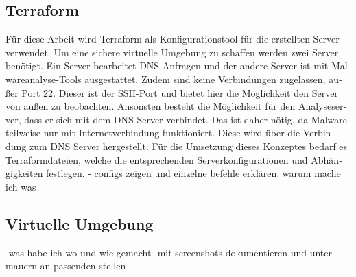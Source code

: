 \begin{otherlanguage}{ngerman}
\subsection{Terraform}\label{Praktisches Terraform}
Für diese Arbeit wird Terraform als Konfigurationstool für die erstellten Server verwendet. Um eine sichere virtuelle Umgebung zu schaffen werden zwei Server benötigt. Ein Server bearbeitet DNS-Anfragen und der andere Server ist mit Malwareanalyse-Tools ausgestattet. Zudem sind keine Verbindungen zugelassen, außer Port 22. Dieser ist der SSH-Port und bietet hier die Möglichkeit den Server von außen zu beobachten. Ansonsten besteht die Möglichkeit für den Analyseserver, dass er sich mit dem DNS Server verbindet. Das ist daher nötig, da Malware teilweise nur mit Internetverbindung funktioniert. Diese wird über die Verbindung zum DNS Server hergestellt. 
\newline
Für die Umsetzung dieses Konzeptes bedarf es Terraformdateien, welche die entsprechenden Serverkonfigurationen und Abhängigkeiten festlegen.
\newline
- configs zeigen und einzelne befehle erklären: warum mache ich was
\subsection{Virtuelle Umgebung}
-was habe ich wo und wie gemacht
\newline
-mit screenshots dokumentieren und untermauern an passenden stellen
\end{otherlanguage}